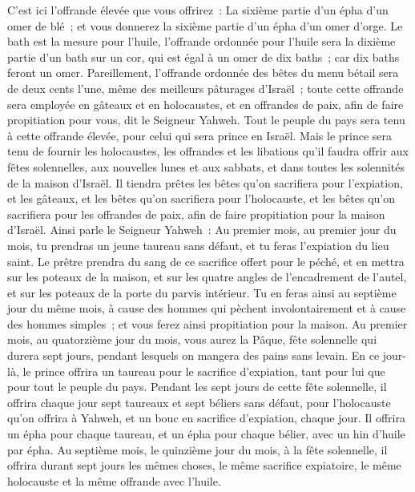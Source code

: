 \begin{multicols}{2}
C'est ici l'offrande élevée que vous offrirez~: La sixième partie d'un épha d'un omer de blé~; et vous donnerez la sixième partie d'un épha d'un omer d'orge.
Le bath est la mesure pour l'huile, l'offrande ordonnée pour l'huile sera la dixième partie d'un bath sur un cor, qui est égal à un omer de dix baths~; car dix baths feront un omer.
Pareillement, l'offrande ordonnée des bêtes du menu bétail sera de deux cents l'une, même des meilleurs pâturages d'Israël~; toute cette offrande sera employée en gâteaux et en holocaustes, et en offrandes de paix, afin de faire propitiation pour vous, dit le Seigneur Yahweh.
Tout le peuple du pays sera tenu à cette offrande élevée, pour celui qui sera prince en Israël.
Mais le prince sera tenu de fournir les holocaustes, les offrandes et les libations qu'il faudra offrir aux fêtes solennelles, aux nouvelles lunes et aux sabbats, et dans toutes les solennités de la maison d'Israël. Il tiendra prêtes les bêtes qu'on sacrifiera pour l'expiation, et les gâteaux, et les bêtes qu'on sacrifiera pour l'holocauste, et les bêtes qu'on sacrifiera pour les offrandes de paix, afin de faire propitiation pour la maison d'Israël.
Ainsi parle le Seigneur Yahweh~: Au premier mois, au premier jour du mois, tu prendras un jeune taureau sans défaut, et tu feras l'expiation du lieu saint.
Le prêtre prendra du sang de ce sacrifice offert pour le péché, et en mettra sur les poteaux de la maison, et sur les quatre angles de l'encadrement de l'autel, et sur les poteaux de la porte du parvis intérieur.
Tu en feras ainsi au septième jour du même mois, à cause des hommes qui pèchent involontairement et à cause des hommes simples~; et vous ferez ainsi propitiation pour la maison.
Au premier mois, au quatorzième jour du mois, vous aurez la Pâque, fête solennelle qui durera sept jours, pendant lesquels on mangera des pains sans levain.
En ce jour-là, le prince offrira un taureau pour le sacrifice d'expiation, tant pour lui que pour tout le peuple du pays.
Pendant les sept jours de cette fête solennelle, il offrira chaque jour sept taureaux et sept béliers sans défaut, pour l'holocauste qu'on offrira à Yahweh, et un bouc en sacrifice d'expiation, chaque jour.
Il offrira un épha pour chaque taureau, et un épha pour chaque bélier, avec un hin d'huile par épha.
Au septième mois, le quinzième jour du mois, à la fête solennelle, il offrira durant sept jours les mêmes choses, le même sacrifice expiatoire, le même holocauste et la même offrande avec l'huile.

\end{multicols}
